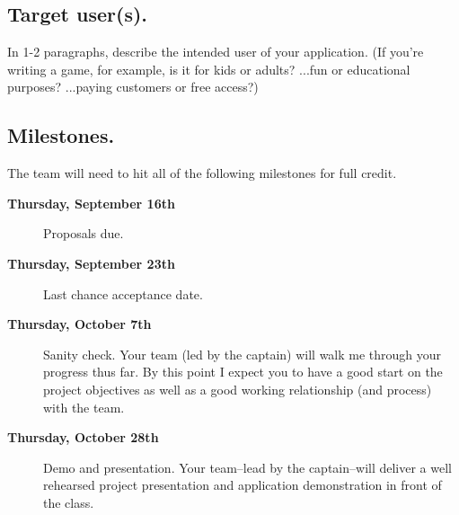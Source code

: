 \documentclass[12pt]{article}
\begin{document}
\underline{\phantom{\hspace{5in}}}

\subsection{Target user(s).}
In 1-2 paragraphs, describe the intended user of your application. (If you're writing a game, for example, is it for kids or adults? ...fun or educational purposes? ...paying customers or free access?)


\underline{\phantom{\hspace{5in}}}

\underline{\phantom{\hspace{5in}}}

\underline{\phantom{\hspace{5in}}}

\underline{\phantom{\hspace{5in}}}

\underline{\phantom{\hspace{5in}}}

\underline{\phantom{\hspace{5in}}}

\underline{\phantom{\hspace{5in}}}

\underline{\phantom{\hspace{5in}}}

\underline{\phantom{\hspace{5in}}}

\subsection{Milestones.}
The team will need to hit all of the following milestones for full credit.

\begin{description}
\item[\bf Thursday, September 16th] Proposals due. 
\item[\bf Thursday, September 23th] Last chance acceptance date. 
\item[\bf Thursday, October 7th] Sanity check. Your team (led by the captain) will walk me through your progress thus far. By this point I expect you to have a good start on the project objectives as well as a good working relationship (and process) with the team.
\item[\bf Thursday, October 28th] Demo and presentation. Your team--lead by the captain--will deliver a well rehearsed project presentation and application demonstration in front of the class.
\end{description}
\end{document}
